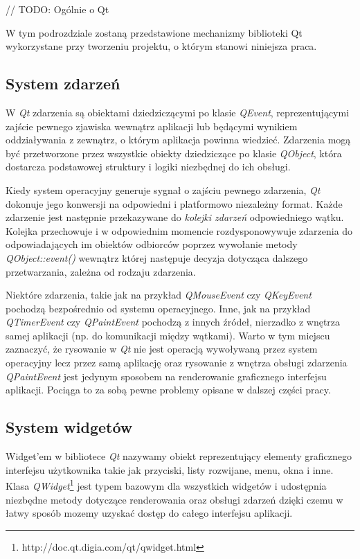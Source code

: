 // TODO: Ogólnie o Qt

W tym podrozdziale zostaną przedstawione mechanizmy biblioteki Qt wykorzystane przy tworzeniu projektu, o którym stanowi niniejsza praca. 

\subsection{System zdarzeń}
W \emph{Qt} zdarzenia są obiektami dziedziczącymi po klasie \emph{QEvent}, reprezentującymi zajście pewnego zjawiska wewnątrz aplikacji lub będącymi wynikiem oddziaływania z zewnątrz, o którym aplikacja powinna wiedzieć. Zdarzenia mogą być przetworzone przez wszystkie obiekty dziedziczące po klasie \emph{QObject}, która dostarcza podstawowej struktury i logiki niezbędnej do ich obsługi. 

Kiedy system operacyjny generuje sygnał o zajściu pewnego zdarzenia, \emph{Qt} dokonuje jego konwersji na odpowiedni i platformowo niezależny format. Każde zdarzenie jest następnie przekazywane do \emph{kolejki zdarzeń} odpowiedniego wątku. Kolejka przechowuje i w odpowiednim momencie rozdysponowywuje zdarzenia do odpowiadających im obiektów odbiorców poprzez wywołanie metody \emph{QObject::event()} wewnątrz której następuje decyzja dotycząca dalszego przetwarzania, zależna od rodzaju zdarzenia. 

Niektóre zdarzenia, takie jak na przykład \emph{QMouseEvent} czy \emph{QKeyEvent} pochodzą bezpośrednio od systemu operacyjnego. Inne, jak na przykład \emph{QTimerEvent} czy \emph{QPaintEvent} pochodzą z innych źródeł, nierzadko z wnętrza samej aplikacji (np. do komunikacji między wątkami). Warto w tym miejscu zaznaczyć, że rysowanie w \emph{Qt} nie jest operacją wywoływaną przez system operacyjny lecz przez samą aplikację oraz rysowanie z wnętrza obsługi zdarzenia \emph{QPaintEvent} jest jedynym sposobem na renderowanie graficznego interfejsu aplikacji. Pociąga to za sobą pewne problemy opisane w dalszej części pracy.

\subsection{System widgetów}
Widget'em w bibliotece \emph{Qt} nazywamy obiekt reprezentujący elementy graficznego interfejsu użytkownika takie jak przyciski, listy rozwijane, menu, okna i inne. Klasa \emph{QWidget}\footnote{http://doc.qt.digia.com/qt/qwidget.html} jest typem bazowym dla wszystkich widgetów i udostępnia niezbędne metody dotyczące renderowania oraz obsługi zdarzeń dzięki czemu w łatwy sposób mozemy uzyskać dostęp do całego interfejsu aplikacji.

